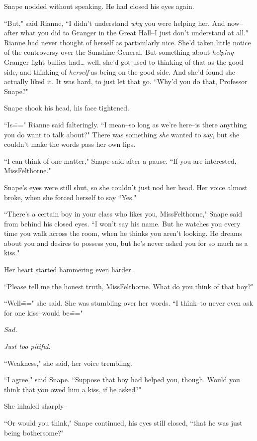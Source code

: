 Snape nodded without speaking. He had closed his eyes again.

``But," said Rianne, ``I didn't understand \emph{why} you were helping her. And now\---after what you did to Granger in the Great Hall\---I just don't understand at all." Rianne had never thought of herself as particularly nice. She'd taken little notice of the controversy over the Sunshine General. But something about \emph{helping} Granger fight bullies had{\ldots} well, she'd got used to thinking of that as the good side, and thinking of \emph{herself} as being on the good side. And she'd found she actually liked it. It was hard, to just let that go. ``Why'd you do that, Professor Snape?"

Snape shook his head, his face tightened.

``Is\===" Rianne said falteringly. ``I mean\---so long as we're here\---is there anything you do want to talk about?" There was something \emph{she} wanted to say, but she couldn't make the words pass her own lips.

``I can think of one matter," Snape said after a pause. ``If you are interested, Miss\?Felthorne."

Snape's eyes were still shut, so she couldn't just nod her head. Her voice almost broke, when she forced herself to say ``Yes."

``There's a certain boy in your class who likes you, Miss\?Felthorne," Snape said from behind his closed eyes. ``I won't say his name. But he watches you every time you walk across the room, when he thinks you aren't looking. He dreams about you and desires to possess you, but he's never asked you for so much as a kiss."

Her heart started hammering even harder.

``Please tell me the honest truth, Miss\?Felthorne. What do you think of that boy?"

``Well\===" she said. She was stumbling over her words. ``I think\---to never even ask for one kiss\---would be\==="

\emph{Sad.}

\emph{Just too pitiful.}

``Weakness," she said, her voice trembling.

``I agree," said Snape. ``Suppose that boy had helped you, though. Would you think that you owed him a kiss, if he asked?"

She inhaled sharply\---

``Or would you think," Snape continued, his eyes still closed, ``that he was just being bothersome?"

